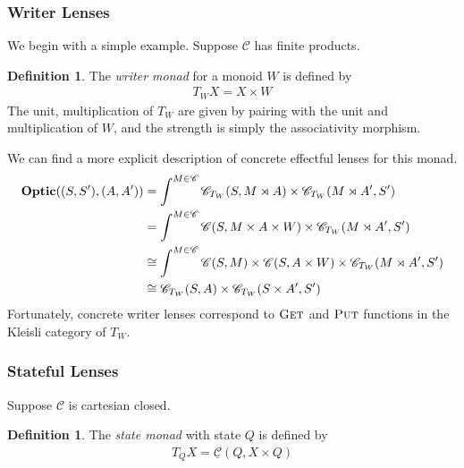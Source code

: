 \documentclass[11pt,letterpaper]{article}
\theoremstyle{plain}
\theoremstyle{definition}
\newtheorem{definition}[theorem]{Definition}
\newcommand{\C}{\mathscr{C}}
\newcommand{\homC}{\underline{\C}}
\newcommand{\Optic}{\mathbf{Optic}}
\newcommand{\fget}{\textsc{Get}}
\newcommand{\fput}{\textsc{Put}}
\begin{document}
\subsubsection{Writer Lenses}
We begin with a simple example. Suppose $\C$ has finite products.
\begin{definition}
The \emph{writer monad} for a monoid $W$ is defined by
\begin{align*}
T_W X = X \times W
\end{align*}
The unit, multiplication of $T_W$ are given by pairing with the unit and multiplication of $W$, and the strength is simply the associativity morphism.
\end{definition}

We can find a more explicit description of concrete effectful lenses for this monad.
\begin{align*}
\Optic((S, S'), (A, A'))
&= \int^{M \in \C} \C_{T_W}(S, M \monact A) \times \C_{T_W}(M \monact A', S') \\
&= \int^{M \in \C} \C(S, M \times A \times W) \times \C_{T_W}(M \monact A', S') \\
&\cong \int^{M \in \C} \C(S, M) \times \C(S, A\times W) \times \C_{T_W}(M \monact A', S') \\
&\cong \C_{T_W}(S, A) \times \C_{T_W}(S \times A', S')
\end{align*}
Fortunately, concrete writer lenses correspond to $\fget$ and $\fput$ functions in the Kleisli category of $T_W$.

\subsubsection{Stateful Lenses}

Suppose $\C$ is cartesian closed.

\begin{definition}
The \emph{state monad} with state $Q$ is defined by
\begin{align*}
T_Q X = \homC(Q, X \times Q)
\end{align*}
\end{definition}
\end{document}

